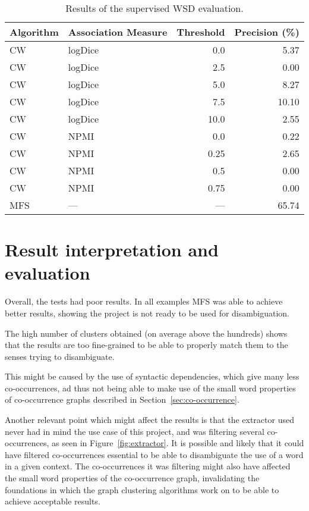 \begin{table}[ht]
\caption{Results of the supervised \ac*{WSD} evaluation.}
\label{tab:sup-results}
\begin{tabu} to \textwidth {Xlrr}
\hline
\textbf{Algorithm} & \textbf{Association Measure} & \textbf{Threshold} & \textbf{Precision (\%)} \\
\hline
\ac{CW} & logDice   &  0.0 &  5.37 \\
\ac{CW} & logDice   &  2.5 &  0.00 \\
\ac{CW} & logDice   &  5.0 &  8.27 \\
\ac{CW} & logDice   &  7.5 & 10.10 \\
\ac{CW} & logDice   & 10.0 &  2.55 \\
\hline
\ac{CW} & \ac{NPMI} & 0.0  &  0.22 \\
\ac{CW} & \ac{NPMI} & 0.25 &  2.65 \\
\ac{CW} & \ac{NPMI} & 0.5  &  0.00 \\
\ac{CW} & \ac{NPMI} & 0.75 &  0.00 \\
\hline
\ac{MFS} & ---      &  --- & 65.74 \\
\hline
\end{tabu}
\end{table}

\section{Result interpretation and evaluation}

Overall, the tests had poor results. In all examples \ac{MFS} was able to
achieve better results, showing the project is not ready to be used for
disambiguation.

The high number of clusters obtained (on average above the hundreds) shows that
the results are too fine-grained to be able to properly match them to the senses
trying to disambiguate.

This might be caused by the use of syntactic dependencies, which give many less
co-occurrences, ad thus not being able to make use of the small word properties
of co-occurrence graphs described in Section~\ref{sec:co-occurrence}.

Another relevant point which might affect the results is that the extractor used
\cite{correia2015syntax} never had in mind the use case of this project, and was
filtering several co-occurrences, as seen in Figure~\ref{fig:extractor}. It is
possible and likely that it could have filtered co-occurrences essential to be
able to disambiguate the use of a word in a given context. The co-occurrences
it was filtering might also have affected the small word properties of the
co-occurrence graph, invalidating the foundations in which the graph clustering
algorithms work on to be able to achieve acceptable results.

